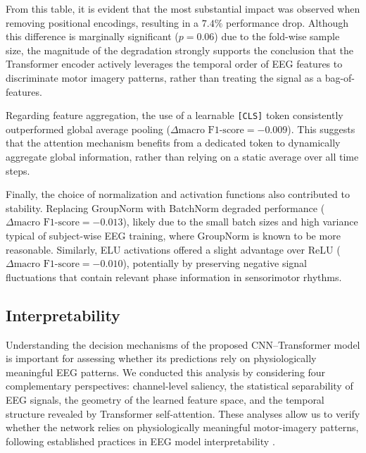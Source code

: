 \documentclass[a4paper,fleqn]{cas-dc}
\begin{document}
From this table, it is evident that the most substantial impact was observed when removing positional encodings, resulting in a $7.4\%$ performance drop. Although this difference is marginally significant ($p=0.06$) due to the fold-wise sample size, the magnitude of the degradation strongly supports the conclusion that the Transformer encoder actively leverages the temporal order of EEG features to discriminate motor imagery patterns, rather than treating the signal as a bag-of-features.

Regarding feature aggregation, the use of a learnable \texttt{[CLS]} token consistently outperformed global average pooling ($\Delta \text{macro F1-score} = -0.009$). This suggests that the attention mechanism benefits from a dedicated token to dynamically aggregate global information, rather than relying on a static average over all time steps.

Finally, the choice of normalization and activation functions also contributed to stability. Replacing GroupNorm with BatchNorm degraded performance ($\Delta \text{macro F1-score} = -0.013$), likely due to the small batch sizes and high variance typical of subject-wise EEG training, where GroupNorm is known to be more reasonable. Similarly, ELU activations offered a slight advantage over ReLU ($\Delta \text{macro F1-score} = -0.010$), potentially by preserving negative signal fluctuations that contain relevant phase information in sensorimotor rhythms.

\subsection{Interpretability}
Understanding the decision mechanisms of the proposed CNN–Transformer model is important for assessing whether its predictions rely on physiologically meaningful EEG patterns. We conducted this analysis by considering four complementary perspectives: channel-level saliency, the statistical separability of EEG signals, the geometry of the learned feature space, and the temporal structure revealed by Transformer self-attention. These analyses allow us to verify whether the network relies on physiologically meaningful motor-imagery patterns, following established practices in EEG model interpretability \citep{tibor2017deep,nagarajan2023relevance,saibene2024deep}.
\end{document}
